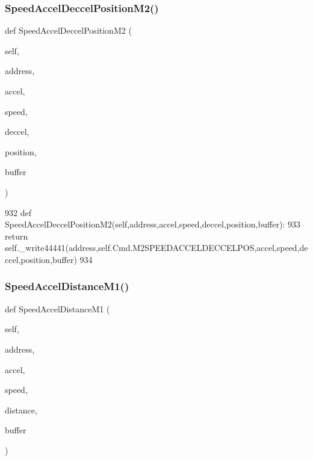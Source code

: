 \subsubsection{\texorpdfstring{Speed\+Accel\+Deccel\+Position\+M2()}{SpeedAccelDeccelPositionM2()}}
{\footnotesize\ttfamily def Speed\+Accel\+Deccel\+Position\+M2 (\begin{DoxyParamCaption}\item[{}]{self,  }\item[{}]{address,  }\item[{}]{accel,  }\item[{}]{speed,  }\item[{}]{deccel,  }\item[{}]{position,  }\item[{}]{buffer }\end{DoxyParamCaption})}


\begin{DoxyCode}
932     \textcolor{keyword}{def }SpeedAccelDeccelPositionM2(self,address,accel,speed,deccel,position,buffer):
933         \textcolor{keywordflow}{return} self.\_write44441(address,self.Cmd.M2SPEEDACCELDECCELPOS,accel,speed,deccel,position,buffer)
934 
\end{DoxyCode}
\mbox{\label{classtoxic__hardware_1_1roboclaw__3_1_1Roboclaw_a111c7779f07f5757ba9ba7e93b0edb39}} 
\subsubsection{\texorpdfstring{Speed\+Accel\+Distance\+M1()}{SpeedAccelDistanceM1()}}
{\footnotesize\ttfamily def Speed\+Accel\+Distance\+M1 (\begin{DoxyParamCaption}\item[{}]{self,  }\item[{}]{address,  }\item[{}]{accel,  }\item[{}]{speed,  }\item[{}]{distance,  }\item[{}]{buffer }\end{DoxyParamCaption})}


